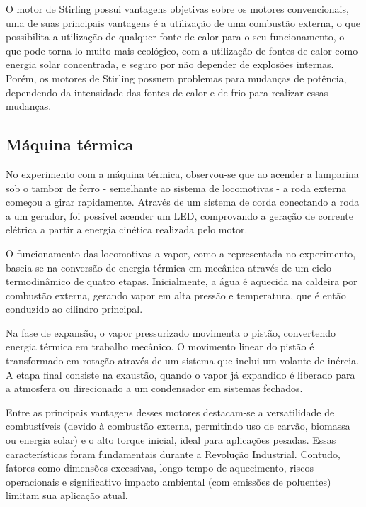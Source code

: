 O motor de Stirling possui vantagens objetivas sobre os motores convencionais, uma de suas principais vantagens é a utilização de uma combustão externa, o que possibilita a utilização de qualquer fonte de calor para o seu funcionamento, o que pode torna-lo muito mais ecológico, com a utilização de fontes de calor como energia solar concentrada, e seguro por não depender de explosões internas. Porém, os motores de Stirling possuem problemas para mudanças de potência, dependendo da intensidade das fontes de calor e de frio para realizar essas mudanças. 

\subsection{Máquina térmica} %
No experimento com a máquina térmica, observou-se que ao acender a lamparina sob o tambor de ferro - semelhante ao sistema de locomotivas - a roda externa começou a girar rapidamente. Através de um sistema de corda conectando a roda a um gerador, foi possível acender um LED, comprovando a geração de corrente elétrica a partir a energia cinética realizada pelo motor.

O funcionamento das locomotivas a vapor, como a representada no experimento, baseia-se na conversão de energia térmica em mecânica através de um ciclo termodinâmico de quatro etapas. Inicialmente, a água é aquecida na caldeira por combustão externa, gerando vapor em alta pressão e temperatura, que é então conduzido ao cilindro principal.

Na fase de expansão, o vapor pressurizado movimenta o pistão, convertendo energia térmica em trabalho mecânico. O movimento linear do pistão é transformado em rotação através de um sistema que inclui um volante de inércia. A etapa final consiste na exaustão, quando o vapor já expandido é liberado para a atmosfera ou direcionado a um condensador em sistemas fechados.

Entre as principais vantagens desses motores destacam-se a versatilidade de combustíveis (devido à combustão externa, permitindo uso de carvão, biomassa ou energia solar) e o alto torque inicial, ideal para aplicações pesadas. Essas características foram fundamentais durante a Revolução Industrial. Contudo, fatores como dimensões excessivas, longo tempo de aquecimento, riscos operacionais e significativo impacto ambiental (com emissões de poluentes) limitam sua aplicação atual.
